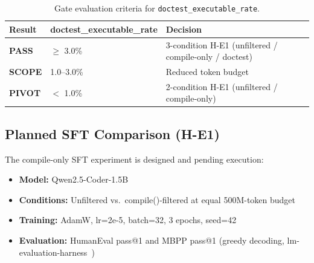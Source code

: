 \begin{table}[h]
\centering
\caption{Gate evaluation criteria for \texttt{doctest\_executable\_rate}.}
\label{tab:gate}
\begin{tabular}{lll}
\toprule
\textbf{Result} & \textbf{doctest\_executable\_rate} & \textbf{Decision} \\
\midrule
\textbf{PASS} & $\geq$ 3.0\% & 3-condition H-E1 (unfiltered / compile-only / doctest) \\
\textbf{SCOPE} & 1.0--3.0\% & Reduced token budget \\
\textbf{PIVOT} & $<$ 1.0\% & 2-condition H-E1 (unfiltered / compile-only) \\
\bottomrule
\end{tabular}
\end{table}

\subsection{Planned SFT Comparison (H-E1)}

The compile-only SFT experiment is designed and pending execution:
\begin{itemize}
\item \textbf{Model:} Qwen2.5-Coder-1.5B~\cite{Hui2024Qwen25Coder}
\item \textbf{Conditions:} Unfiltered vs.\ compile()-filtered at equal 500M-token budget
\item \textbf{Training:} AdamW, lr=2e-5, batch=32, 3 epochs, seed=42
\item \textbf{Evaluation:} HumanEval pass@1 and MBPP pass@1 (greedy decoding, lm-evaluation-harness~\cite{EvalHarness2021})
\end{itemize}
